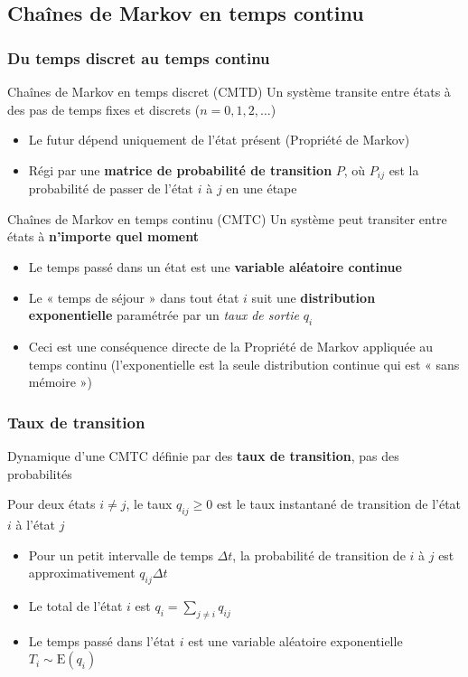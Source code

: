 \documentclass[aspectratio=169]{beamer}\usepackage[]{graphicx}\usepackage[]{xcolor}
\begin{document}
\subsection{Chaînes de Markov en temps continu}
\begin{frame}
    \frametitle{Du temps discret au temps continu}
    \begin{block}{Chaînes de Markov en temps discret (CMTD)}
        Un système transite entre états à des pas de temps fixes et discrets ($n=0, 1, 2, \dots$)
        \begin{itemize}
            \item Le futur dépend uniquement de l'état présent (Propriété de Markov)
            \item Régi par une \textbf{matrice de probabilité de transition} $P$, où $P_{ij}$ est la probabilité de passer de l'état $i$ à $j$ en une étape
        \end{itemize}
    \end{block}

    \begin{block}{Chaînes de Markov en temps continu (CMTC)}
        Un système peut transiter entre états à \textbf{n'importe quel moment}
        \begin{itemize}
            \item Le temps passé dans un état est une \textbf{variable aléatoire continue}
            \item Le « temps de séjour » dans tout état $i$ suit une \textbf{distribution exponentielle} paramétrée par un \textit{taux de sortie} $q_i$
            \item Ceci est une conséquence directe de la Propriété de Markov appliquée au temps continu (l'exponentielle est la seule distribution continue qui est « sans mémoire »)
        \end{itemize}
    \end{block}
\end{frame}

\begin{frame}
    \frametitle{Taux de transition}
    Dynamique d'une CMTC définie par des \textbf{taux de transition}, pas des probabilités

    \begin{definition}
        Pour deux états $i \neq j$, le taux $q_{ij} \ge 0$ est le taux instantané de transition de l'état $i$ à l'état $j$
        \begin{itemize}
            \item Pour un petit intervalle de temps $\Delta t$, la probabilité de transition de $i$ à $j$ est approximativement $q_{ij} \Delta t$
            \item Le  total de l'état $i$ est $q_i = \sum_{j \neq i} q_{ij}$
            \item Le temps passé dans l'état $i$ est une variable aléatoire exponentielle $T_i \sim \text{E}(q_i)$
        \end{itemize}
    \end{definition}
\end{frame}
\end{document}
